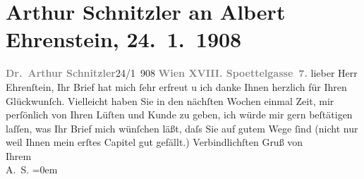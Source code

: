 

         
         \newcommand{\erwaehntePersonen}{Personen: Albert Ehrenstein}
         \newcommand{\erwaehnteOrte}{Orte: Edmund-Weiß-Gasse, Wien}
         \newcommand{\erwaehnteWerke}{Werke: Der Weg ins Freie. Roman}
               \section[Arthur Schnitzler an Albert Ehrenstein, 24. 1. 1908]{ Arthur Schnitzler an Albert Ehrenstein, 24. 1. 1908}\nopagebreak{}\rehead{ }\begin{ledgroupsized}[t]{13cm}\normalsize\beginnumbering \toendnotes[C]{\smallbreak\pagebreak[2]} 
\toendnotes[C]{\smallbreak}\pstart
           \noindent{}{\pb}\textcolor{gray}{\textbf{Dr. Arthur Schnitzler}}\hfill 24/1 908\pend
           \pstart
           \textcolor{gray}{\textbf{Wien XVIII. Spoettelgasse 7.}}\pend
           \pstart
           lieber Herr Ehrenſtein, Ihr Brief hat mich ſehr erfreut u ich danke
               Ihnen herzlich für Ihren Glückwunſch. Vielleicht haben Sie in den nächſten Wochen
               einmal Zeit, mir perſönlich von Ihren Lüſten und \label{T_L01757_1v}\label{T_L01757_1h} Kunde zu geben, ich würde mir
               gern beſtätigen {\pb}laſſen, was Ihr Brief mich wünſchen läßt, daſs
               Sie auf gutem Wege ſind (nicht nur weil Ihnen mein erſtes Capitel gut gefällt.)\pend
           \pstart
           Verbindlichſten Gruß von{\\[\baselineskip]} Ihrem{\\[\baselineskip]}\spacefill\mbox{A. S.}\pend
           \leftskip=0em{}
         
         \endnumbering{}\end{ledgroupsized}  \newcommand{\dateiname}{L01757}\newcommand{\titel}{Arthur Schnitzler an Albert Ehrenstein, 24. 1. 1908}\newcommand{\editorInnen}{Martin Anton Müller und Gerd-Hermann Susen}
      